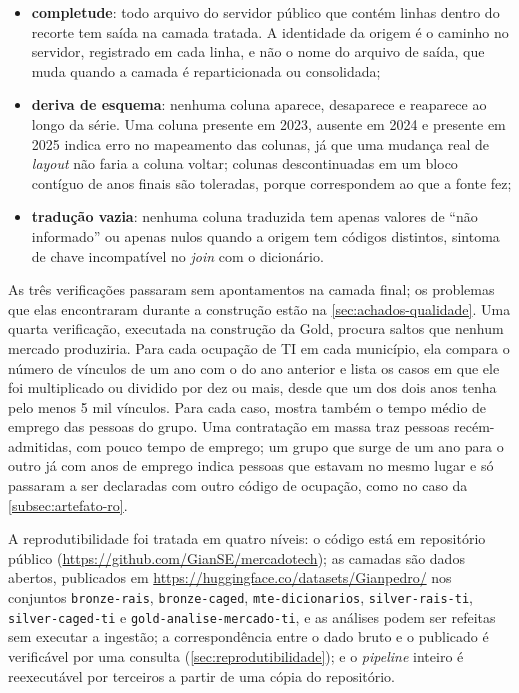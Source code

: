 \begin{itemize}
    \item \textbf{completude}: todo arquivo do servidor público que contém linhas dentro do recorte tem saída na camada tratada. A identidade da origem é o caminho no servidor, registrado em cada linha, e não o nome do arquivo de saída, que muda quando a camada é reparticionada ou consolidada;
    \item \textbf{deriva de esquema}: nenhuma coluna aparece, desaparece e reaparece ao longo da série. Uma coluna presente em 2023, ausente em 2024 e presente em 2025 indica erro no mapeamento das colunas, já que uma mudança real de \textit{layout} não faria a coluna voltar; colunas descontinuadas em um bloco contíguo de anos finais são toleradas, porque correspondem ao que a fonte fez;
    \item \textbf{tradução vazia}: nenhuma coluna traduzida tem apenas valores de ``não informado'' ou apenas nulos quando a origem tem códigos distintos, sintoma de chave incompatível no \textit{join} com o dicionário.
\end{itemize}

As três verificações passaram sem apontamentos na camada final; os problemas que elas encontraram durante a construção estão na \autoref{sec:achados-qualidade}. Uma quarta verificação, executada na construção da Gold, procura saltos que nenhum mercado produziria. Para cada ocupação de TI em cada município, ela compara o número de vínculos de um ano com o do ano anterior e lista os casos em que ele foi multiplicado ou dividido por dez ou mais, desde que um dos dois anos tenha pelo menos 5 mil vínculos. Para cada caso, mostra também o tempo médio de emprego das pessoas do grupo. Uma contratação em massa traz pessoas recém-admitidas, com pouco tempo de emprego; um grupo que surge de um ano para o outro já com anos de emprego indica pessoas que estavam no mesmo lugar e só passaram a ser declaradas com outro código de ocupação, como no caso da \autoref{subsec:artefato-ro}.

\label{sec:reprodutibilidade-metodo}
A reprodutibilidade foi tratada em quatro níveis: o código está em repositório público (\url{https://github.com/GianSE/mercadotech}); as camadas são dados abertos, publicados em \url{https://huggingface.co/datasets/Gianpedro/} nos conjuntos \texttt{bronze-\allowbreak rais}, \texttt{bronze-\allowbreak caged}, \texttt{mte-\allowbreak dicionarios}, \texttt{silver-\allowbreak rais-\allowbreak ti}, \texttt{silver-\allowbreak caged-\allowbreak ti} e \texttt{gold-\allowbreak analise-\allowbreak mercado-\allowbreak ti}, e as análises podem ser refeitas sem executar a ingestão; a correspondência entre o dado bruto e o publicado é verificável por uma consulta (\autoref{sec:reprodutibilidade}); e o \textit{pipeline} inteiro é reexecutável por terceiros a partir de uma cópia do repositório.

